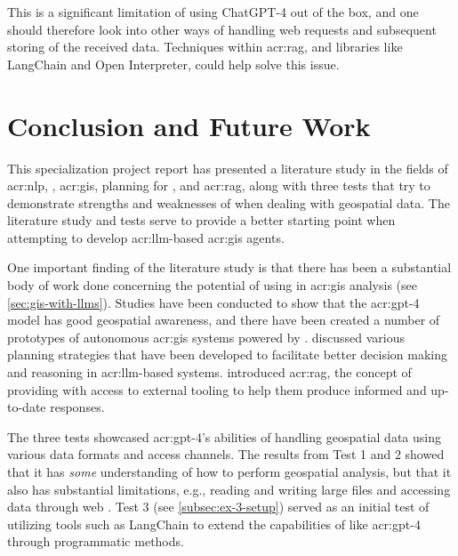 This is a significant limitation of using ChatGPT-4 out of the box, and one should therefore look into other ways of handling web requests and subsequent storing of the received data. Techniques within \gls{acr:rag}, and libraries like LangChain and Open Interpreter, could help solve this issue.

\glsresetall

\section{Conclusion and Future Work}\label{sec:conclusion-and-future-work}

This specialization project report has presented a literature study in the fields of \acrlong{acr:nlp}, , \acrshort{acr:gis}, planning for , and \acrlong{acr:rag}, along with three tests that try to demonstrate strengths and weaknesses of  when dealing with geospatial data. The literature study and tests serve to provide a better starting point when attempting to develop \acrshort{acr:llm}-based \acrshort{acr:gis} agents.

One important finding of the literature study is that there has been a substantial body of work done concerning the potential of using  in \acrshort{acr:gis} analysis (see \autoref{sec:gis-with-llms}). Studies have been conducted to show that the \acrshort{acr:gpt}-4 model has good geospatial awareness, and there have been created a number of prototypes of autonomous \acrshort{acr:gis} systems powered by .  discussed various planning strategies that have been developed to facilitate better decision making and reasoning in \acrshort{acr:llm}-based systems.  introduced \gls{acr:rag}, the concept of providing  with access to external tooling to help them produce informed and up-to-date responses.

The three tests showcased \acrshort{acr:gpt}-4's abilities of handling geospatial data using various data formats and access channels. The results from Test 1 and 2 showed that it has \textit{some} understanding of how to perform geospatial analysis, but that it also has substantial limitations, e.g., reading and writing large files and accessing data through web . Test 3 (see \autoref{subsec:ex-3-setup}) served as an initial test of utilizing tools such as LangChain to extend the capabilities of  like \acrshort{acr:gpt}-4 through programmatic methods.

